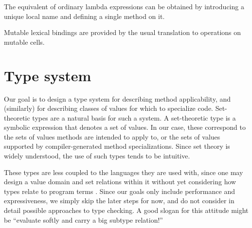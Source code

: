 
The equivalent of ordinary lambda expressions can be obtained by introducing
a unique local name and defining a single method on it.

Mutable lexical bindings are provided by the usual translation to operations
on mutable cells.






\section{Type system}

Our goal is to design a type system for describing method applicability,
and (similarly) for describing classes of values for which to specialize code.
Set-theoretic types are a natural basis for such a system.
A set-theoretic type is a symbolic expression that denotes a set of values.
In our case, these correspond to the sets of values methods are intended to apply
to, or the sets of values supported by compiler-generated method specializations.
Since set theory is widely understood, the use of such types tends to be intuitive.

These types
are less coupled to the languages they are used with, since one may design
a value domain and set relations within it without yet considering how types
relate to program terms \cite{1029823} \cite{Castagna:2005:GIS:1069774.1069793}.
Since our goals only include
performance and expressiveness, we simply skip the later steps for now, and do
not consider in detail possible approaches to type checking.
A good slogan for this attitude might be ``evaluate softly and carry a big
subtype relation!''

